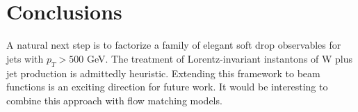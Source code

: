 \section{Conclusions}\label{sec:conclusions}

A natural next step is to factorize a family of elegant soft drop
observables for jets with $p_T > 500$ GeV. The treatment of
Lorentz-invariant instantons of W plus jet production is admittedly
heuristic. Extending this framework to beam functions is an exciting
direction for future work. It would be interesting to combine this
approach with flow matching models.

